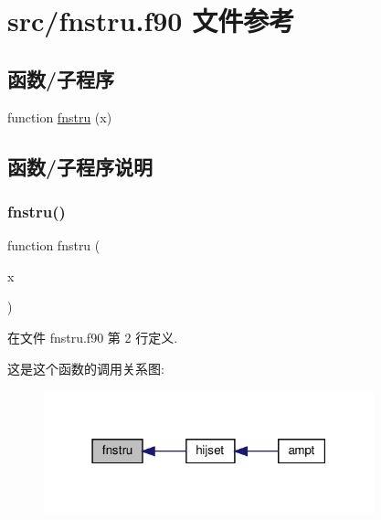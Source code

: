 \hypertarget{fnstru_8f90}{}\section{src/fnstru.f90 文件参考}
\label{fnstru_8f90}
\subsection*{函数/子程序}
\begin{DoxyCompactItemize}
\item 
function \mbox{\hyperlink{fnstru_8f90_a8707603bd7230f675c9d672d873d439c}{fnstru}} (x)
\end{DoxyCompactItemize}


\subsection{函数/子程序说明}
\mbox{\label{fnstru_8f90_a8707603bd7230f675c9d672d873d439c}} 
\subsubsection{\texorpdfstring{fnstru()}{fnstru()}}
{\footnotesize\ttfamily function fnstru (\begin{DoxyParamCaption}\item[{}]{x }\end{DoxyParamCaption})}



在文件 fnstru.\+f90 第 2 行定义.

这是这个函数的调用关系图\+:
\nopagebreak
\begin{figure}[H]
\begin{center}
\leavevmode
\includegraphics[width=271pt]{fnstru_8f90_a8707603bd7230f675c9d672d873d439c_icgraph}
\end{center}
\end{figure}
